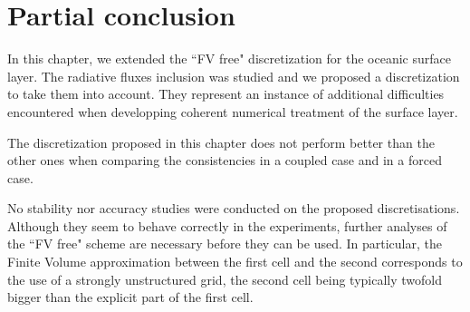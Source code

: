 \section{Partial conclusion}
In this chapter, we extended the ``FV free" discretization
for the oceanic surface layer. The radiative fluxes inclusion
was studied and we proposed a discretization to take them
into account. They represent an instance of additional
difficulties encountered when developping coherent
numerical treatment of the surface layer.
\par
The discretization proposed in this chapter does not
perform better than the other ones when comparing
the consistencies in a coupled case and in a forced
case.
\par
No stability nor accuracy studies were conducted on the proposed
discretisations. Although they seem to behave correctly in the
experiments, further analyses of the ``FV free" scheme are
necessary before they can be used. In particular,
the Finite Volume approximation between the first cell and the second
corresponds to the use of a strongly unstructured grid,
the second cell being typically twofold bigger than
the explicit part of the first cell.
